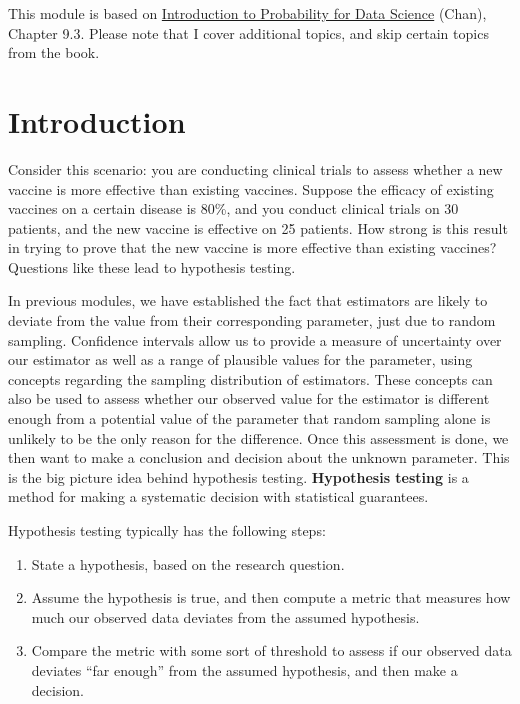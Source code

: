 \documentclass[
]{book}
\providecommand{\tightlist}{%
  \setlength{\itemsep}{0pt}\setlength{\parskip}{0pt}}
\begin{document}
This module is based on \href{https://probability4datascience.com}{Introduction to Probability for Data Science} (Chan), Chapter 9.3. Please note that I cover additional topics, and skip certain topics from the book.

\hypertarget{introduction-5}{%
\section{Introduction}\label{introduction-5}}

Consider this scenario: you are conducting clinical trials to assess whether a new vaccine is more effective than existing vaccines. Suppose the efficacy of existing vaccines on a certain disease is 80\%, and you conduct clinical trials on 30 patients, and the new vaccine is effective on 25 patients. How strong is this result in trying to prove that the new vaccine is more effective than existing vaccines? Questions like these lead to hypothesis testing.

In previous modules, we have established the fact that estimators are likely to deviate from the value from their corresponding parameter, just due to random sampling. Confidence intervals allow us to provide a measure of uncertainty over our estimator as well as a range of plausible values for the parameter, using concepts regarding the sampling distribution of estimators. These concepts can also be used to assess whether our observed value for the estimator is different enough from a potential value of the parameter that random sampling alone is unlikely to be the only reason for the difference. Once this assessment is done, we then want to make a conclusion and decision about the unknown parameter. This is the big picture idea behind hypothesis testing. \textbf{Hypothesis testing} is a method for making a systematic decision with statistical guarantees.

Hypothesis testing typically has the following steps:

\begin{enumerate}
\def\labelenumi{\arabic{enumi}.}
\tightlist
\item
  State a hypothesis, based on the research question.
\item
  Assume the hypothesis is true, and then compute a metric that measures how much our observed data deviates from the assumed hypothesis.
\item
  Compare the metric with some sort of threshold to assess if our observed data deviates ``far enough'' from the assumed hypothesis, and then make a decision.
\end{enumerate}
\end{document}
